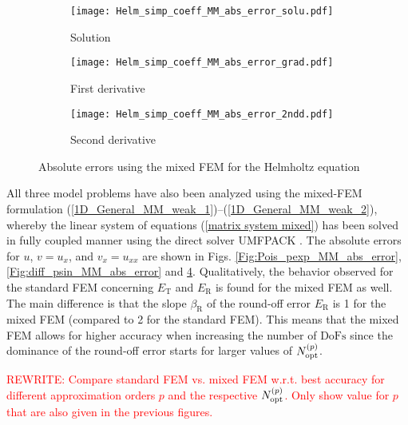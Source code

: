 \documentclass[final,3p]{elsarticle}
\begin{document}
\begin{figure}[!ht]
    \begin{subfigure}{5.5cm}
        \texttt{[image: Helm\_simp\_coeff\_MM\_abs\_error\_solu.pdf]}
        \caption{Solution}
        \label{Fig:Helm_simp_coeff_MM_abs_error_solu}
    \end{subfigure}
    \begin{subfigure}{5.5cm}
        \texttt{[image: Helm\_simp\_coeff\_MM\_abs\_error\_grad.pdf]}
        \caption{First derivative}
        \label{Fig:Helm_simp_coeff_MM_abs_error_grad}
    \end{subfigure}
    \begin{subfigure}{5.5cm}
        \texttt{[image: Helm\_simp\_coeff\_MM\_abs\_error\_2ndd.pdf]}
        \caption{Second derivative}
        \label{Fig:Helm_simp_coeff_MM_abs_error_2ndd}
    \end{subfigure}  
\caption{Absolute errors using the mixed FEM for the Helmholtz equation}
\label{Fig:Helm_simp_coeff_MM_abs_error}
\end{figure}

All three model problems have also been analyzed using the mixed-FEM formulation (\ref{1D_General_MM_weak_1})--(\ref{1D_General_MM_weak_2}), whereby the linear system of equations (\ref{matrix system mixed}) has been solved in fully coupled manner using the direct solver UMFPACK \citep{davis2004algorithm}. The absolute errors for $u$, $v=u_x$, and $v_x=u_{xx}$ are shown in Figs. \ref{Fig:Pois_pexp_MM_abs_error}, \ref{Fig:diff_psin_MM_abs_error} and \ref{Fig:Helm_simp_coeff_MM_abs_error}. 
Qualitatively, the behavior observed for the standard FEM concerning ${E}_{\text{T}}$ and ${E}_{\text{R}}$ is found for the mixed FEM as well.
The main difference is that the slope $\beta _{\text{R}}$ of the round-off error ${E}_{\text{R}}$ is 1 for the mixed FEM (compared to 2 for the standard FEM). 
This means that the mixed FEM allows for higher accuracy when increasing the number of $\text{DoFs}$ since the dominance of the round-off error starts for larger values of $N_{\rm opt}^{(p)}$.

\textcolor{red}{REWRITE: Compare standard FEM vs. mixed FEM w.r.t. best accuracy for different approximation orders $p$ and the respective $N_{\rm opt}^{(p)}$. Only show value for $p$ that are also given in the previous figures.} 
\end{document}
